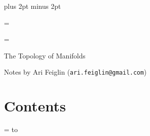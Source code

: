 


\parindent=0pt
\parskip=3pt plus 2pt minus 2pt

\footline={}


\headline={\pagedecor}

{\setboxshadow
\contentbox

    \centerline{The Topology of Manifolds}
    \smallskip
    \centerline{Notes by Ari Feiglin ({\tt ari.feiglin@gmail.com})}

\eppbox

\bigskip

\contentbox
    \section*{Contents}
    
    \tableofcontents
\eppbox

}

\vfill\break

\color{black}

\newif\ifpageodd
\pageoddtrue
\headline={%
    \hbox to \hsize{\color{black}%
        \ifpageodd\hfil{\it\currsubsection\quad\bf\folio}\global\pageoddfalse%
        \else{\bf\folio\quad\it\currsubsection}\hfil\global\pageoddtrue\fi%
    }%
}



\bye

